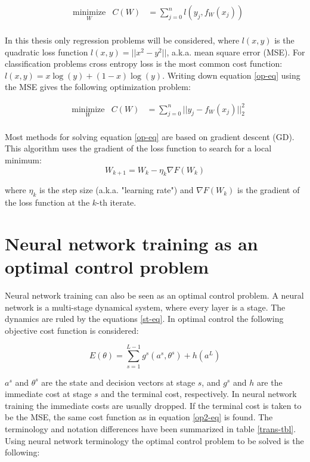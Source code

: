 \begin{equation}
\begin{aligned}
& \underset{W}{\text{minimize}}
& C(W) &= \sum\limits_{j=0}^{n}l(y_j,f_W(x_j)) \\
\end{aligned}
\label{op-eq}
\end{equation}

In this thesis only regression problems will be considered, where $l(x,y)$ is the quadratic loss function $l(x,y) = ||x^2-y^2||$, a.k.a. mean square error (MSE). For classification problems cross entropy loss is the most common cost function: $l(x,y) = x\log(y)+(1-x)\log(y)$. Writing down equation \ref{op-eq} using the MSE gives the following optimization problem:

\begin{equation}
\begin{aligned}
& \underset{W}{\text{minimize}}
& C(W) &= \sum\limits_{j=0}^{n}||y_j - f_W(x_j)||^2_2 \\
\end{aligned}
\label{op2-eq}
\end{equation}

Most methods for solving equation \ref{op-eq} are based on gradient descent (GD). This algorithm uses the gradient of the loss function to search for a local minimum:
\begin{equation}
W_{k+1} = W_{k} - \eta_k\nabla F(W_k)
\label{gd-eq}
\end{equation}

where $\eta_k$ is the step size (a.k.a. "learning rate") and $\nabla F(W_k)$ is the gradient of the loss function at the $k$-th iterate.

\section{Neural network training as an optimal control problem}
Neural network training can also be seen as an optimal control problem. A neural network is a multi-stage dynamical system, where every layer is a stage. The dynamics are ruled by the equations \ref{st-eq}. In optimal control the following objective cost function is considered:

\begin{equation}
E(\theta) = \sum\limits_{s=1}^{L-1}g^s(a^s,\theta^s) + h(a^L)
\end{equation}


$a^s$ and $\theta^s$ are the state and decision vectors at stage $s$, and $g^s$ and $h$ are the immediate cost at stage $s$ and the terminal cost, respectively. In neural network training the immediate costs are usually dropped. If the terminal cost is taken to be the MSE, the same cost function as in equation \ref{op2-eq} is found. The terminology and notation differences have been summarized in table \ref{trans-tbl}. Using neural network terminology the optimal control problem to be solved is the following:

